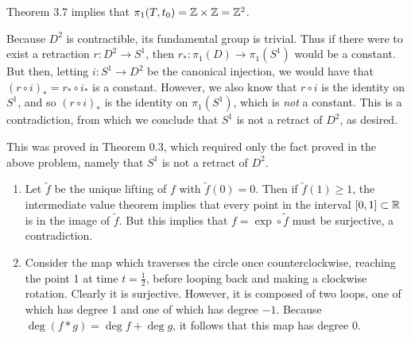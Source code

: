 \documentclass[../../solutions.tex]{subfiles}
\begin{document}
\begin{exercise} \leavevmode
Theorem 3.7 implies that $\pi_1(T,t_0)=\mathbb{Z}\times\mathbb{Z}=\mathbb{Z}^2$. 
\end{exercise}

\begin{exercise} \leavevmode
Because $D^2$ is contractible, its fundamental group is trivial. 
Thus if there were to exist a retraction $r:D^2\to S^1$, then $r_*:\pi_1(D)\to\pi_1(S^1)$ would be a constant. 
But then, letting $i:S^1\to D^2$ be the canonical injection, we would have that $(r\circ i)_*=r_*\circ i_*$ is a constant. 
However, we also know that $r\circ i$ is the identity on $S^1$, and so $(r\circ i)_*$ is the identity on $\pi_1(S^1)$, which is \textit{not} a constant. 
This is a contradiction, from which we conclude that $S^1$ is not a retract of $D^2$, as desired. 
\end{exercise}

\begin{exercise} \leavevmode
This was proved in Theorem 0.3, which required only the fact proved in the above problem, namely that $S^1$ is not a retract of $D^2$. 
\end{exercise}

\begin{exercise} \leavevmode
\begin{enumerate}
\item Let $\tilde f$ be the unique lifting of $f$ with $\tilde f(0)=0$. 
Then if $\tilde f(1)\ge1$, the intermediate value theorem implies that every point in the interval $[0,1]\subset\mathbb{R}$ is in the image of $\tilde f$. 
But this implies that $f=\exp\circ\tilde f$ must be surjective, a contradiction. 

\item Consider the map which traverses the circle once counterclockwise, reaching the point 1 at time $t=\frac12$, before looping back and making a clockwise rotation. 
Clearly it is surjective. 
However, it is composed of two loops, one of which has degree 1 and one of which has degree $-1$. 
Because $\deg(f*g)=\deg f+\deg g$, it follows that this map has degree 0. 
\end{enumerate}
\end{exercise}
\end{document}
